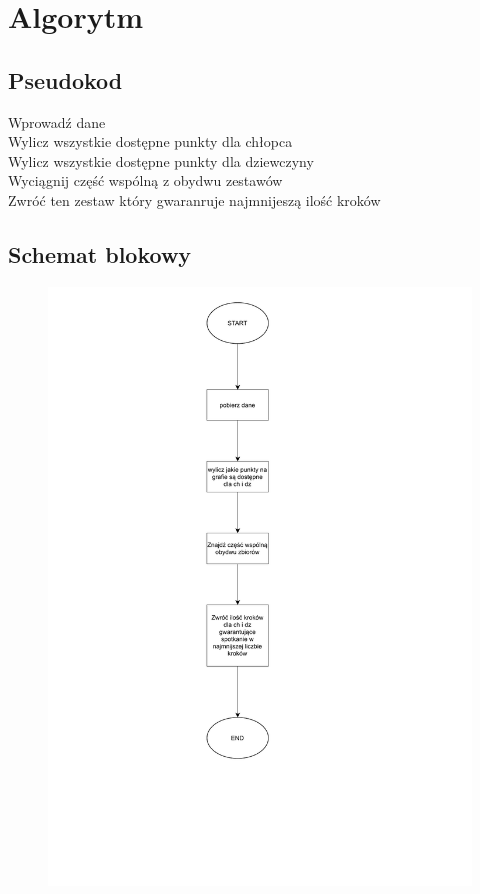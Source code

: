 \documentclass[12pt,a4paper]{article}
\begin{document}
	\section{Algorytm}

	
    \subsection{Pseudokod}
    \begin{algorithm}
        	Wprowadź dane\\
        	Wylicz wszystkie dostępne punkty dla chłopca\\
        	Wylicz wszystkie dostępne punkty dla dziewczyny\\
        	Wyciągnij część wspólną z obydwu zestawów\\
        	Zwróć ten zestaw który gwaranruje najmnijeszą ilość kroków\\
        	
    \end{algorithm}
    \newpage
	\subsection{Schemat blokowy}
	
	\begin{figure}[!htb]
	    \centering
	    \includegraphics[scale=0.45]{graph.pdf}
	\end{figure}
\end{document}
